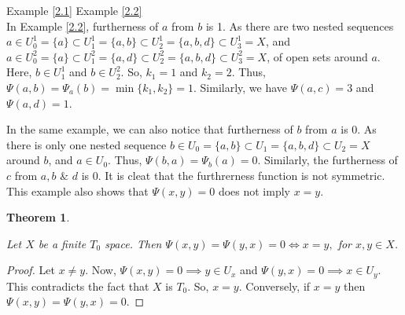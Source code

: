 \documentclass[12pt]{amsart}
\newtheorem{theorem}[definition]{Theorem}
\newtheorem{remark}[definition]{Remark}
\begin{document}
\hspace{20mm}	Example \ref{2.1}\hspace{45mm} Example \ref{2.2}\\


In Example \ref{2.2}, furtherness of $a$ from $b$ is 1. As there are two nested sequences $a\in U^1_0=\{a\}\subset U^1_1= \{a,b\}\subset U^1_2=\{a,b,d\}\subset U^1_3=X$, and $a\in U^2_0=\{a\}\subset U^2_1= \{a,d\}\subset U^2_2=\{a,b,d\}\subset U^2_3=X$, of open sets around $a$. Here, $b\in  U^1_1$ and $b\in U^2_2$. So, $k_1=1$ and $k_2=2$. Thus, $\Psi(a,b)=\Psi_{a}(b)=\min\{k_1,k_2\}=1.$
Similarly, we have $\Psi(a,c)=3$ and $\Psi(a,d)=1.$\par 
In the same example, we can also notice that furtherness of $b$ from $a$ is 0. As there is only one nested sequence $b\in U_0=\{a,b\}\subset U_1=\{a,b,d\}\subset U_2=X$ around $b$, and $a\in U_0$. Thus, $\Psi(b,a)=\Psi_{b}(a)=0$. Similarly, the furtherness of $c$  from $a,b$ $\&$ $d$ is 0. It is cleat that the furthrerness function is not symmetric. This example also shows that $\Psi(x,y)=0$ does not imply $x=y$.


\begin{theorem}\label{2.6}
	
	Let $X$ be a finite $T_0$ space. Then $ \Psi(x,y)=\Psi(y,x)=0 \iff x=y,$ for $ x,y\in X$.
	
\end{theorem} 

\begin{proof}
	Let $x\neq y$. Now, $ \Psi(x,y)=0 \implies y\in U_x$ and $\Psi(y,x)=0 \implies x\in U_y$.
	This contradicts the fact that $X$ is $T_0$. So, $x=y$. Conversely, if $x=y$ then $\Psi(x,y)=\Psi(y,x)=0$.
\end{proof}
\end{document}
